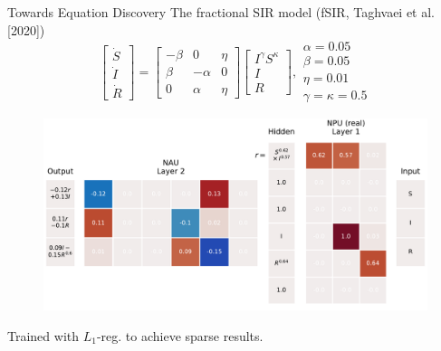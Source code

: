 \documentclass{beamer}
\begin{document}
\begin{frame}{Towards Equation Discovery}
  \centering
  The fractional SIR model (fSIR, Taghvaei et al. [2020])
  \begin{equation*}
    \begin{bmatrix}
      \dot S \\ \dot I \\ \dot R
    \end{bmatrix}
    =
    \begin{bmatrix}
      -\beta & 0 & \eta \\
      \beta & -\alpha & 0 \\
      0 & \alpha & \eta
    \end{bmatrix}
    \begin{bmatrix}
      I^\gamma S^\kappa \\ I \\ R
    \end{bmatrix},
    \begin{matrix}
      \alpha=0.05 \\ \beta=0.05 \\ \eta=0.01 \\ \gamma=\kappa=0.5
    \end{matrix}
  \end{equation*}
  \begin{figure}
    \includegraphics[width=0.8\linewidth]{../plots/sir_gatednpu_modelps.pdf}
  \end{figure}
  \vspace{-1.5cm}
  \hspace{-4cm}
  {\tiny *Trained with $L_1$-reg. to achieve sparse results.}
\end{frame}

\maketitle
\end{document}
